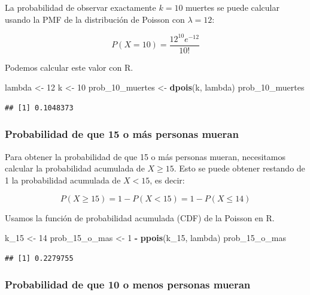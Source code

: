 \documentclass[
]{article}
\newenvironment{Shaded}{\begin{snugshade}}{\end{snugshade}}
\newcommand{\DecValTok}[1]{\textcolor[rgb]{0.00,0.00,0.81}{#1}}
\newcommand{\FunctionTok}[1]{\textcolor[rgb]{0.13,0.29,0.53}{\textbf{#1}}}
\newcommand{\NormalTok}[1]{#1}
\newcommand{\OtherTok}[1]{\textcolor[rgb]{0.56,0.35,0.01}{#1}}
\newcommand{\SpecialCharTok}[1]{\textcolor[rgb]{0.81,0.36,0.00}{\textbf{#1}}}
\begin{document}
La probabilidad de observar exactamente \(k = 10\) muertes se puede calcular usando la PMF de la distribución de Poisson con \(\lambda = 12\):

\[ P(X = 10) = \frac{12^{10} e^{-12}}{10!} \]

Podemos calcular este valor con R.

\begin{Shaded}
\begin{Highlighting}[]
\NormalTok{lambda }\OtherTok{\textless{}{-}} \DecValTok{12}
\NormalTok{k }\OtherTok{\textless{}{-}} \DecValTok{10}
\NormalTok{prob\_10\_muertes }\OtherTok{\textless{}{-}} \FunctionTok{dpois}\NormalTok{(k, lambda)}
\NormalTok{prob\_10\_muertes}
\end{Highlighting}
\end{Shaded}

\begin{verbatim}
## [1] 0.1048373
\end{verbatim}

\subsubsection{Probabilidad de que 15 o más personas mueran}\label{probabilidad-de-que-15-o-muxe1s-personas-mueran}

Para obtener la probabilidad de que 15 o más personas mueran, necesitamos calcular la probabilidad acumulada de \(X \geq 15\). Esto se puede obtener restando de 1 la probabilidad acumulada de \(X < 15\), es decir:

\[ P(X \geq 15) = 1 - P(X < 15) = 1 - P(X \leq 14) \]

Usamos la función de probabilidad acumulada (CDF) de la Poisson en R.

\begin{Shaded}
\begin{Highlighting}[]
\NormalTok{k\_15 }\OtherTok{\textless{}{-}} \DecValTok{14}
\NormalTok{prob\_15\_o\_mas }\OtherTok{\textless{}{-}} \DecValTok{1} \SpecialCharTok{{-}} \FunctionTok{ppois}\NormalTok{(k\_15, lambda)}
\NormalTok{prob\_15\_o\_mas}
\end{Highlighting}
\end{Shaded}

\begin{verbatim}
## [1] 0.2279755
\end{verbatim}

\subsubsection{Probabilidad de que 10 o menos personas mueran}\label{probabilidad-de-que-10-o-menos-personas-mueran}
\end{document}
